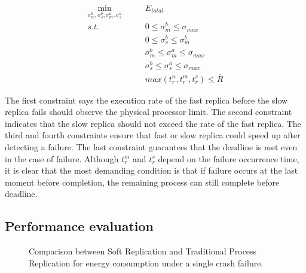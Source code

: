 \begin{equation}
\begin{alignedat}{2}
\min_{\sigma_m^b,\sigma_s^b,\sigma_m^a,\sigma_s^a} \qquad  & E_{total} \\
s.t.  \qquad          & 0 \leq \sigma_m^b \leq \sigma_{max} \\
                      & 0 \leq \sigma_s^b \leq \sigma_m^b \\
                     & \sigma_m^b \leq \sigma_m^a \leq \sigma_{max} \\
                      & \sigma_s^b \leq \sigma_s^a \leq \sigma_{max} \\
                      & max(t_r^n, t_r^m, t_r^s) \leq \overline{R}
\end{alignedat}
\end{equation}

The first constraint says the execution rate of the fast replica before the slow replica fails should observe the physical processor limit. The second constraint indicates that the slow replica should not exceed  the rate of the fast replica. The third and fourth constraints ensure that fast or slow replica could speed up after detecting a failure. The last constraint guarantees that the deadline is met even in the case of failure. Although $t_r^m$ and $t_r^s$ depend on the failure occurrence time, it is clear that the most demanding condition is that if failure occurs at the last moment before completion, the remaining process can still complete before deadline. 

\subsection{Performance evaluation}

\begin{figure}[!t]
	\begin{center}
	\end{center}
	\caption{Comparison between Soft Replication and Traditional Process Replication for energy consumption under a single crash failure.}
	\label{fig:crash_eval}
\end{figure}


